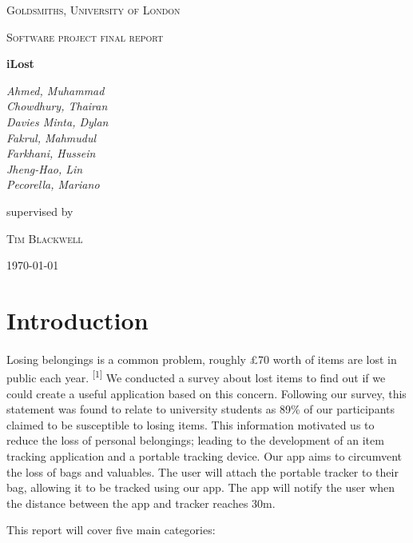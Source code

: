 \documentclass[12pt,a4paper]{article}
\begin{document}
    \begin{titlepage}
      \centering
      {\scshape\LARGE Goldsmiths, University of London \par}
      \vspace{1cm}
      {\scshape\Large Software project final report\par}
      \vspace{1.5cm}
      {\huge\bfseries iLost\par}
      \vspace{2cm}
      {\Large\itshape 
        Ahmed, Muhammad\\
        Chowdhury, Thairan\\
        Davies Minta, Dylan\\     
        Fakrul, Mahmudul\\    
        Farkhani, Hussein\\ 
        Jheng-Hao, Lin\\
        Pecorella, Mariano\\ \par}
      \vfill
      supervised by\par
      \textsc{Tim Blackwell} 
      \vfill
      {\large \today \par}
    \end{titlepage}
    \tableofcontents
    \newpage
    \section{Introduction}
      \paragraph{} Losing belongings is a common problem, roughly £70 worth of items are lost in public each year. \textsuperscript{[1]} We conducted a survey about lost items to find out if we could create a useful application based on this concern. Following our survey, this statement was found to relate to university students as 89\% of our participants claimed to be susceptible to losing items. This information motivated us to reduce the loss of personal belongings; leading to the development of an item tracking application and a portable tracking device. Our app aims to circumvent the loss of bags and valuables. The user will attach the portable tracker to their bag, allowing it to be tracked using our app. The app will notify the user when the distance between the app and tracker reaches 30m.

      This report will cover five main categories:
\end{document}
